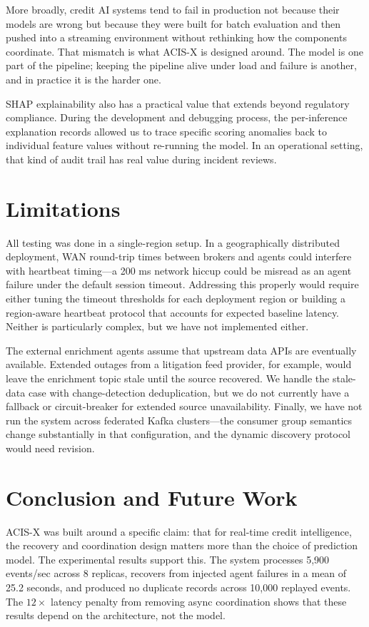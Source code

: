 \documentclass[runningheads]{llncs}
\begin{document}
More broadly, credit AI systems tend to fail in production not because their models are wrong but because they were built for batch evaluation and then pushed into a streaming environment without rethinking how the components coordinate. That mismatch is what ACIS-X is designed around. The model is one part of the pipeline; keeping the pipeline alive under load and failure is another, and in practice it is the harder one.

SHAP explainability also has a practical value that extends beyond regulatory compliance. During the development and debugging process, the per-inference explanation records allowed us to trace specific scoring anomalies back to individual feature values without re-running the model. In an operational setting, that kind of audit trail has real value during incident reviews.

\section{Limitations}

All testing was done in a single-region setup. In a geographically distributed deployment, WAN round-trip times between brokers and agents could interfere with heartbeat timing---a 200 ms network hiccup could be misread as an agent failure under the default session timeout. Addressing this properly would require either tuning the timeout thresholds for each deployment region or building a region-aware heartbeat protocol that accounts for expected baseline latency. Neither is particularly complex, but we have not implemented either.

The external enrichment agents assume that upstream data APIs are eventually available. Extended outages from a litigation feed provider, for example, would leave the enrichment topic stale until the source recovered. We handle the stale-data case with change-detection deduplication, but we do not currently have a fallback or circuit-breaker for extended source unavailability. Finally, we have not run the system across federated Kafka clusters---the consumer group semantics change substantially in that configuration, and the dynamic discovery protocol would need revision.

\section{Conclusion and Future Work}

ACIS-X was built around a specific claim: that for real-time credit intelligence, the recovery and coordination design matters more than the choice of prediction model. The experimental results support this. The system processes 5,900 events/sec across 8 replicas, recovers from injected agent failures in a mean of 25.2 seconds, and produced no duplicate records across 10,000 replayed events. The $12\times$ latency penalty from removing async coordination shows that these results depend on the architecture, not the model.
\end{document}
